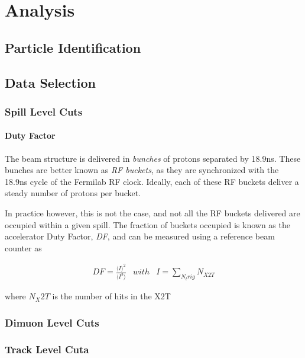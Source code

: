 \chapter{Analysis}



\section{Particle Identification}




\section{Data Selection}

\subsection{Spill Level Cuts}

\subsubsection{Duty Factor}

The beam structure is delivered in \emph{bunches} 
of protons separated by 18.9ns. These bunches are better
known as \emph{RF buckets}, as they are synchronized with the 18.9ns cycle of the Fermilab RF clock. Ideally, each of these RF buckets deliver a steady number of protons per bucket.

In practice however, this is not the case, and not all the RF buckets delivered are occupied within a given spill. The fraction of buckets occupied is known as the accelerator Duty Factor, \emph{DF}, and can be measured using a reference beam counter as

\begin{eqnarray} DF = \frac{\langle I \rangle ^2}{\langle I^2 \rangle} &
with &  I = \sum_{N_trig} N_{X2T}
\end{eqnarray}

where $N_X2T$ is the number of hits in the X2T 

\subsection{Dimuon Level Cuts}

\subsection{Track Level Cuta}

